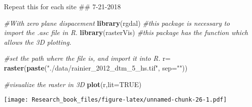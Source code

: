 \documentclass[]{book}
\newenvironment{Shaded}{\begin{snugshade}}{\end{snugshade}}
\newcommand{\KeywordTok}[1]{\textcolor[rgb]{0.13,0.29,0.53}{\textbf{#1}}}
\newcommand{\DataTypeTok}[1]{\textcolor[rgb]{0.13,0.29,0.53}{#1}}
\newcommand{\DecValTok}[1]{\textcolor[rgb]{0.00,0.00,0.81}{#1}}
\newcommand{\StringTok}[1]{\textcolor[rgb]{0.31,0.60,0.02}{#1}}
\newcommand{\CommentTok}[1]{\textcolor[rgb]{0.56,0.35,0.01}{\textit{#1}}}
\newcommand{\OtherTok}[1]{\textcolor[rgb]{0.56,0.35,0.01}{#1}}
\newcommand{\OperatorTok}[1]{\textcolor[rgb]{0.81,0.36,0.00}{\textbf{#1}}}
\newcommand{\NormalTok}[1]{#1}
\theoremstyle{definition}
\theoremstyle{definition}
\theoremstyle{definition}
\theoremstyle{remark}
\begin{document}
Repeat this for each site \#\# 7-21-2018

\begin{Shaded}
\begin{Highlighting}[]
\CommentTok{#With zero plane dispacement}
\KeywordTok{library}\NormalTok{(rgdal) }\CommentTok{#this package is necessary to import the .asc file in R.}
\KeywordTok{library}\NormalTok{(rasterVis) }\CommentTok{#this package has the function which allows the 3D plotting.}

\CommentTok{#set the path where the file is, and import it into R.}
\NormalTok{r=}\StringTok{ }\KeywordTok{raster}\NormalTok{(}\KeywordTok{paste}\NormalTok{(}\StringTok{"./data/rainier_2012_dtm_5_hs.tif"}\NormalTok{, }\DataTypeTok{sep=}\StringTok{""}\NormalTok{))}

\CommentTok{#visualize the raster in 3D}
\KeywordTok{plot}\NormalTok{(r,}\DataTypeTok{lit=}\OtherTok{TRUE}\NormalTok{)}
\end{Highlighting}
\end{Shaded}

\texttt{[image: Research\_book\_files/figure-latex/unnamed-chunk-26-1.pdf]}

\begin{Shaded}
\end{Shaded}
\end{document}
